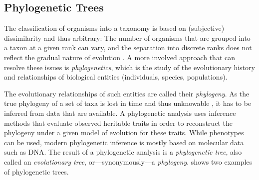 

\subsection{Phylogenetic Trees}
\label{ch:Foundations:sec:TreeOfLife:sub:PhylogeneticTrees}

The classification of organisms into a taxonomy is based on (subjective) dissimilarity and thus arbitrary:
The number of organisms that are grouped into a taxon at a given rank can vary,
and the separation into discrete ranks does not reflect the gradual nature of evolution \cite{Gingerich1987}.
A more involved approach that can resolve these issues is \emph{phylogenetics},
which is the study of the evolutionary history and relationships of biological entities (individuals, species, populations).

The evolutionary relationships of such entities are called their \emph{phylogeny}.
As the true phylogeny of a set of taxa is lost in time and thus unknowable \cite{Haber2005},
it has to be inferred from data that are available.
A phylogenetic analysis uses inference methods that evaluate observed heritable traits
in order to reconstruct the phylogeny under a given model of evolution for these traits.
While phenotypes can be used, modern phylogenetic inference is mostly based on molecular data such as DNA.
The result of a phylogenetic analysis is a \emph{phylogenetic tree},
also called an \emph{evolutionary tree}, or---synonymously---a \emph{phylogeny}.
 shows two examples of phylogenetic trees.

